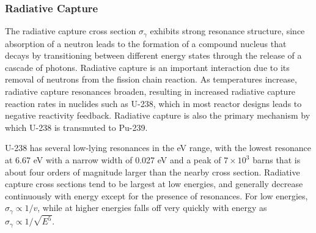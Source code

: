 \subsubsection{Radiative Capture}

The radiative capture cross section \(\sigma_\gamma\) exhibits strong resonance structure, since absorption of a neutron leads to the formation of a compound nucleus that decays by transitioning between different energy states through the release of a cascade of photons. Radiative capture is an important interaction due to its removal of neutrons from the fission chain reaction. As temperatures increase, radiative capture resonances broaden, resulting in increased radiative capture reaction rates in nuclides such as U-238, which in most reactor designs leads to negative reactivity feedback. Radiative capture is also the primary mechanism by which U-238 is transmuted to Pu-239.

U-238 has several low-lying resonances in the eV range, with the lowest resonance at 6.67 eV with a narrow width of 0.027 eV and a peak of \(7\times10^3\) barns that is about four orders of magnitude larger than the nearby cross section. Radiative capture cross sections tend to be largest at low energies, and generally decrease continuously with energy except for the presence of resonances. For low energies, \(\sigma_\gamma\propto1/v\), while at higher energies falls off very quickly with energy as \(\sigma_\gamma\propto1/\sqrt{E^5}\).

